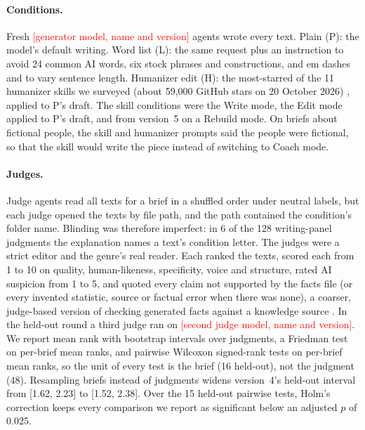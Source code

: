 \documentclass[11pt]{article}
\newcommand{\TBD}[1]{\textcolor{red}{[#1]}}
\newcommand{\genmodel}{\TBD{generator model, name and version}}
\newcommand{\judgemodel}{\TBD{second judge model, name and version}}
\begin{document}
\paragraph{Conditions.} Fresh \genmodel{} agents wrote every text. Plain (P): the model's default writing. Word list (L): the same request plus an instruction to avoid 24 common AI words, six stock phrases and constructions, and em dashes and to vary sentence length. Humanizer edit (H): the most-starred of the 11 humanizer skills we surveyed (about 59,000 GitHub stars on 20 October 2026) \citep{chen2026humanizer}, applied to P's draft. The skill conditions were the Write mode, the Edit mode applied to P's draft, and from version~5 on a Rebuild mode. On briefs about fictional people, the skill and humanizer prompts said the people were fictional, so that the skill would write the piece instead of switching to Coach mode.

\paragraph{Judges.} Judge agents read all texts for a brief in a shuffled order under neutral labels, but each judge opened the texts by file path, and the path contained the condition's folder name. Blinding was therefore imperfect: in 6 of the 128 writing-panel judgments the explanation names a text's condition letter. The judges were a strict editor and the genre's real reader. Each ranked the texts, scored each from 1 to 10 on quality, human-likeness, specificity, voice and structure, rated AI suspicion from 1 to 5, and quoted every claim not supported by the facts file (or every invented statistic, source or factual error when there was none), a coarser, judge-based version of checking generated facts against a knowledge source \citep{min2023factscore}. In the held-out round a third judge ran on \judgemodel{}. We report mean rank with bootstrap intervals over judgments, a Friedman test on per-brief mean ranks, and pairwise Wilcoxon signed-rank tests on per-brief mean ranks, so the unit of every test is the brief (16 held-out), not the judgment (48). Resampling briefs instead of judgments widens version~4's held-out interval from [1.62, 2.23] to [1.52, 2.38]. Over the 15 held-out pairwise tests, Holm's correction keeps every comparison we report as significant below an adjusted $p$ of 0.025.
\end{document}
